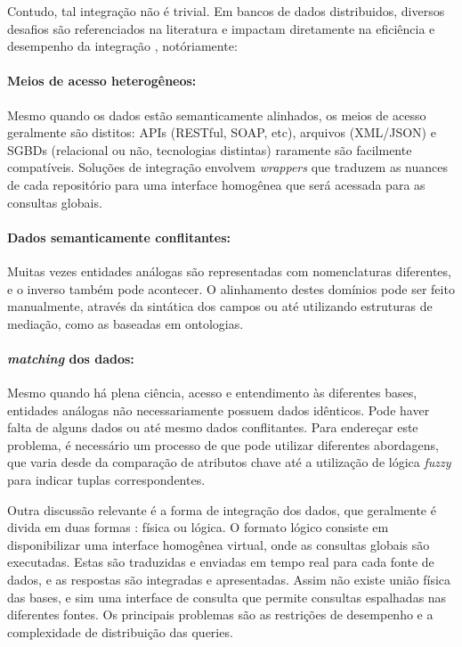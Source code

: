 \documentclass[a4paper,12pt]{monografia}
\theoremstyle{plain}
\theoremstyle{definition}
\theoremstyle{remark}
\begin{document}
Contudo, tal integração não é trivial. Em bancos de dados distribuidos, diversos desafios são referenciados na literatura e impactam diretamente na eficiência e desempenho da integração \cite{ozsu2011}, notóriamente:

\paragraph{Meios de acesso heterogêneos:} Mesmo quando os dados estão semanticamente alinhados, os meios de acesso geralmente são distitos: APIs (RESTful, SOAP, etc), arquivos (XML/JSON) e SGBDs (relacional ou não, tecnologias distintas) raramente são facilmente compatíveis. Soluções de integração envolvem \textit{wrappers} que traduzem as nuances de cada repositório para uma interface homogênea que será acessada para as consultas globais.

\paragraph{Dados semanticamente conflitantes:} Muitas vezes entidades análogas são representadas com nomenclaturas diferentes, e o inverso também pode acontecer. O alinhamento destes domínios pode ser feito manualmente, através da sintática dos campos ou até utilizando estruturas de mediação, como as baseadas em ontologias.

\paragraph{\textit{matching} dos dados:} Mesmo quando há plena ciência, acesso e entendimento às diferentes bases, entidades análogas não necessariamente possuem dados idênticos. Pode haver falta de alguns dados ou até mesmo dados conflitantes. Para endereçar este problema, é necessário um processo de  que pode utilizar diferentes abordagens, que varia desde da comparação de atributos chave até a utilização de lógica \textit{fuzzy} para indicar tuplas correspondentes.

Outra discussão relevante é a forma de integração dos dados, que geralmente é divida em duas formas \cite{ozsu2011}: física ou lógica. O formato lógico consiste em disponibilizar uma interface homogênea virtual, onde as consultas globais são executadas. Estas são traduzidas e enviadas em tempo real para cada fonte de dados, e as respostas são integradas e apresentadas. Assim não existe união física das bases, e sim uma interface de consulta que permite consultas espalhadas nas diferentes fontes. Os principais problemas são as restrições de desempenho e a complexidade de distribuição das queries.
\end{document}
